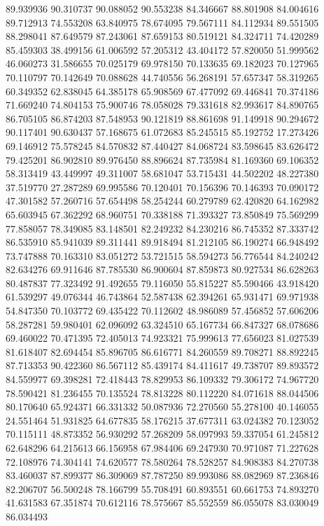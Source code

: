 89.939936
90.310737
90.088052
90.553238
84.346667
88.801908
84.004616
89.712913
74.553208
63.840975
78.674095
79.567111
84.112934
89.551505
88.298041
87.649579
87.243061
87.659153
80.519121
84.324711
74.420289
85.459303
38.499156
61.006592
57.205312
43.404172
57.820050
51.999562
46.060273
31.586655
70.025179
69.978150
70.133635
69.182023
70.127965
70.110797
70.142649
70.088628
44.740556
56.268191
57.657347
58.319265
60.349352
62.838045
64.385178
65.908569
67.477092
69.446841
70.374186
71.669240
74.804153
75.900746
78.058028
79.331618
82.993617
84.890765
86.705105
86.874203
87.548953
90.121819
88.861698
91.149918
90.294672
90.117401
90.630437
57.168675
61.072683
85.245515
85.192752
17.273426
69.146912
75.578245
84.570832
87.440427
84.068724
83.598645
83.626472
79.425201
86.902810
89.976450
88.896624
87.735984
81.169360
69.106352
58.313419
43.449997
49.311007
58.681047
53.715431
44.502202
48.227380
37.519770
27.287289
69.995586
70.120401
70.156396
70.146393
70.090172
47.301582
57.260716
57.654498
58.254244
60.279789
62.420820
64.162982
65.603945
67.362292
68.960751
70.338188
71.393327
73.850849
75.569299
77.858057
78.349085
83.148501
82.249232
84.230216
86.745352
87.333742
86.535910
85.941039
89.311441
89.918494
81.212105
86.190274
66.948492
73.747888
70.163310
83.051272
53.721515
58.594273
56.776544
84.240242
82.634276
69.911646
87.785530
86.900604
87.859873
80.927534
86.628263
80.487837
77.323492
91.492655
79.116050
55.815227
85.590466
43.918420
61.539297
49.076344
46.743864
52.587438
62.394261
65.931471
69.971938
54.847350
70.103772
69.435422
70.112602
48.986089
57.456852
57.606206
58.287281
59.980401
62.096092
63.324510
65.167734
66.847327
68.078686
69.460022
70.471395
72.405013
74.923321
75.999613
77.656023
81.027539
81.618407
82.694454
85.896705
86.616771
84.260559
89.708271
88.892245
87.713353
90.422360
86.567112
85.439174
84.411617
49.738707
89.893572
84.559977
69.398281
72.418443
78.829953
86.109332
79.306172
74.967720
78.590421
81.236455
70.135524
78.813228
80.112220
84.071618
88.044506
80.170640
65.924371
66.331332
50.087936
72.270560
55.278100
40.146055
24.551464
51.931825
64.677835
58.176215
37.677311
63.024382
70.123052
70.115111
48.873352
56.930292
57.268209
58.097993
59.337054
61.245812
62.648296
64.215613
66.156958
67.984406
69.247930
70.971087
71.227628
72.108976
74.304141
74.620577
78.580264
78.528257
84.908383
84.270738
83.460037
87.899377
86.309069
87.787250
89.993086
88.082969
87.236846
82.206707
56.500248
78.166799
55.708491
60.893551
60.661753
74.893270
41.631583
67.351874
70.612116
78.575667
85.552559
86.055078
83.030049
86.034493
